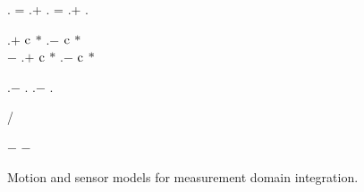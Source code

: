 \begin{figure}[tp]
\begin{algorithm}[H]
{        \BlankLine
        \sv \assign \observation.\sv\;
        \clockDrift = \samplex.\clockDrift + \samplex.\residualDrift{\sv}\;
        \clockOffset = \samplex.\clockOffset + \samplex.\residualOffset{\sv}\;

        \BlankLine
        \pseudorange \assign \observation.\pseudorange \(+\) \(\mathrm{c}\) \(*\) \sv.\clockOffset \(-\) \(\mathrm{c}\) \(*\) \clockOffset\\
            \hspace{1em} \(-\) \delays{\sv, \samplex}\;
        \velocity \assign \observation.\velocity \(+\) \(\mathrm{c}\) \(*\) \sv.\clockDrift \(-\) \(\mathrm{c}\) \(*\) \clockDrift\;

        \BlankLine
        \userToSv \assign \sv.\position \(-\) \samplex.\position\;
        \relativeVelocity \assign \sv.\velocity \(-\) \samplex.\velocity\;

        \geomRange \assign \abs{\userToSv}\;
        \geomVelocity \assign \dotProduct{\relativeVelocity, \userToSv} / \geomRange\;

        \BlankLine
        \rangeError \assign \pseudorange \(-\) \geomRange\;
        \uIf{\abs{\rangeError} \(<\) \SI{\pseudorangeThreshold}{\meter}}{
            \result \assign \normpdf{\rangeError, \(\mu\) = \num{\pseudorangeErrorMu}, \(\sigma\) = \num{\pseudorangeErrorSigma}}\;
        }
        \Else{
            \result \assign \num{\pseudorangeThresholdProbability}
        }
        \velocityError \assign \velocity \(-\) \geomVelocity\;
        \uIf{\abs{\velocityError} \(<\) \SI{\velocityThreshold}{\meter\per\second}}{
            \result \assign \result \(*\) \normpdf{\velocityError, \(\mu\) = \num{\velocityErrorMu}, \(\sigma\) = \num{\velocityErrorSigma}}\;
        }
        \Else{
            \result \assign \result \(*\) \num{\velocityThresholdProbability}
        }
        \Return \result\;
    }
\end{algorithm}
\caption{Motion and sensor models for measurement domain integration.}
\label{algo:gps-measurement-domain}
\end{figure}

